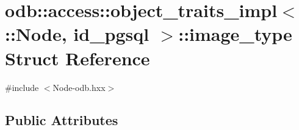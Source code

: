 \hypertarget{structodb_1_1access_1_1object__traits__impl_3_01_1_1_node_00_01id__pgsql_01_4_1_1image__type}{}\section{odb\+:\+:access\+:\+:object\+\_\+traits\+\_\+impl$<$ \+:\+:Node, id\+\_\+pgsql $>$\+:\+:image\+\_\+type Struct Reference}
\label{structodb_1_1access_1_1object__traits__impl_3_01_1_1_node_00_01id__pgsql_01_4_1_1image__type}


{\ttfamily \#include $<$Node-\/odb.\+hxx$>$}

\subsection*{Public Attributes}
